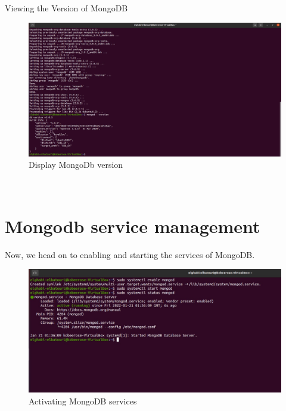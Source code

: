 \begin{spacing}{1.2}
\par Viewing the Version of MongoDB
\\
\begin{figure}[!htb] 
\begin{center} 
\includegraphics[width=1\linewidth]{Pictures/MongoDB/Installation and manipulation of MongoDB/Installation and configuration/Display MongoDb version} 
\end{center} 
\caption{Display MongoDb version} 
\end{figure}  \FloatBarrier
\\

\section{Mongodb service management }
\par Now, we head on to enabling and starting the services of MongoDB.
\\
\begin{figure}[!htb] 
\begin{center} 
\includegraphics[width=1\linewidth]{Pictures/MongoDB/Installation and manipulation of MongoDB/Mongodb service management/activating MongoDB services} 
\end{center} 
\caption{Activating MongoDB services} 
\end{figure}  \FloatBarrier
\\


\end{spacing}
